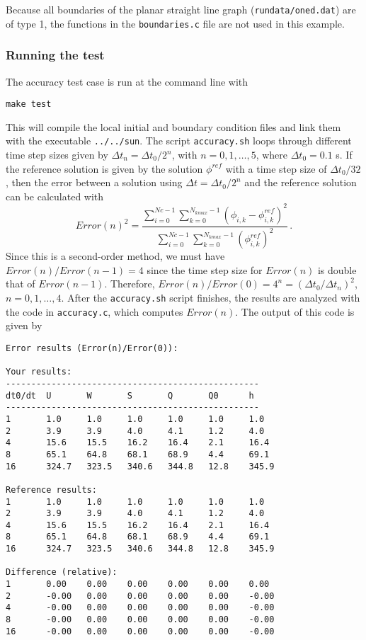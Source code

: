 Because all boundaries of the planar
straight line graph (\verb+rundata/oned.dat+) are of type 1, the functions in the \verb+boundaries.c+ file are
not used in this example.

\subsubsection{Running the test}

The accuracy test case is run at the command line with
\begin{verbatim}
make test
\end{verbatim}
This will compile the local initial and boundary condition files and link them with the
executable \verb+../../sun+.  The script \verb+accuracy.sh+ loops through different
time step sizes given by $\Delta t_n = \Delta t_0/2^n$, with $n=0,1,\dots,5$, where
$\Delta t_0 = 0.1$ s.  If the reference solution is given by the solution $\phi^{ref}$
with a time step size of $\Delta t_0/32$, then the error between a solution using
$\Delta t=\Delta t_0/2^n$ and the 
reference solution can be calculated with
\[
Error(n)^2 = \frac{\sum_{i=0}^{Nc-1}\sum_{k=0}^{N_{kmax}-1} \left(\phi_{i,k}-\phi^{ref}_{i,k}\right)^2}
{\sum_{i=0}^{Nc-1}\sum_{k=0}^{N_{kmax}-1} \left(\phi^{ref}_{i,k}\right)^2}\,.
\]
Since this is a second-order method, we must have $Error(n)/Error(n-1)=4$ since the time step size
for $Error(n)$ is double that of $Error(n-1)$.  Therefore, $Error(n)/Error(0) = 4^n = (\Delta t_0/\Delta t_n)^2$,
$n=0,1,\dots,4$.  After
the \verb+accuracy.sh+ script finishes, the results are analyzed with the code in \verb+accuracy.c+,
which computes $Error(n)$.  The output of this code is given by
\begin{verbatim}
Error results (Error(n)/Error(0)):

Your results:
--------------------------------------------------
dt0/dt  U       W       S       Q       Q0      h
--------------------------------------------------
1       1.0     1.0     1.0     1.0     1.0     1.0
2       3.9     3.9     4.0     4.1     1.2     4.0
4       15.6    15.5    16.2    16.4    2.1     16.4
8       65.1    64.8    68.1    68.9    4.4     69.1
16      324.7   323.5   340.6   344.8   12.8    345.9

Reference results:
1       1.0     1.0     1.0     1.0     1.0     1.0
2       3.9     3.9     4.0     4.1     1.2     4.0
4       15.6    15.5    16.2    16.4    2.1     16.4
8       65.1    64.8    68.1    68.9    4.4     69.1
16      324.7   323.5   340.6   344.8   12.8    345.9

Difference (relative):
1       0.00    0.00    0.00    0.00    0.00    0.00
2       -0.00   0.00    0.00    0.00    0.00    -0.00
4       -0.00   0.00    0.00    0.00    0.00    -0.00
8       -0.00   0.00    0.00    0.00    0.00    -0.00
16      -0.00   0.00    0.00    0.00    0.00    -0.00
\end{verbatim}
